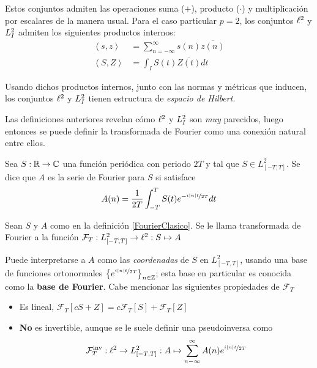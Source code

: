 Estos conjuntos admiten las operaciones  suma ($+$), producto ($\cdot$) y multiplicación por 
escalares de la manera usual.
%
Para el caso particular $p=2$, los conjuntos $\ell^{2}$ y $L^{2}_I$ admiten los siguientes productos 
internos:
%
\begin{align*}
\left\langle s,z \right\rangle &= \sum_{n=-\infty}^{\infty} s(n) \overline{z(n)}\\
\left\langle S,Z \right\rangle &= \int_I S(t) \overline{Z(t)} dt
\end{align*}

Usando dichos productos internos, junto con las normas y métricas que inducen, los conjuntos 
$\ell^{2}$ y $L^{2}_I$ tienen estructura de \textit{espacio de Hilbert}.

Las definiciones anteriores revelan cómo $\ell^{2}$ y $L^{2}_I$ son \textit{muy} parecidos, luego
entonces se puede definir la transformada de Fourier como una conexión natural entre ellos.

\begin{definicion}
Sea $S: \mathbb{R} \rightarrow \mathbb{C}$ una función periódica con periodo $2T$ y tal que 
$S \in L^{2}_{[-T,T]}$. Se dice que $A$ es la serie de Fourier para $S$ si satisface
\begin{equation*}
A(n) = \frac{1}{2 T} \int_{- T }^{ T } S(t) e^{-\nicefrac{ i \left| n \right| t}{2T}} dt
\end{equation*}
\label{FourierClasico}
\end{definicion}

\begin{definicion}
Sean $S$ y $A$ como en la definición \ref{FourierClasico}. Se le llama transformada de Fourier a la
función $\mathcal{F}_T : L^{2}_{[-T,T]} \rightarrow \ell^{2} : S \mapsto A$
\end{definicion}

Puede interpretarse a $A$ como las \textit{coordenadas} de $S$ en $L^{2}_{[-T,T]}$, usando una base 
de funciones ortonormales $\left\{ e^{\nicefrac{i \left| n \right| t}{2 T}} \right\}_{n\in \mathbb{Z}}$; esta base 
en particular es conocida como la \textbf{base de Fourier}.
%
Cabe mencionar las siguientes propiedades de $\mathcal{F}_T$
\begin{itemize}
\item Es lineal, $\mathcal{F}_T[cS + Z] = c\mathcal{F}_T[S] + \mathcal{F}_T[Z]$

\item \textbf{No} es invertible, aunque se le suele definir una pseudoinversa como
\begin{equation*}
\mathcal{F}_{T}^{\text{inv}} : \ell^{2} \rightarrow L^{2}_{[-T,T]} :
A \mapsto \sum_{n -\infty}^{\infty} A(n) e^{\nicefrac{i \left| n \right| t}{2 T}}
\end{equation*}
\end{itemize}

